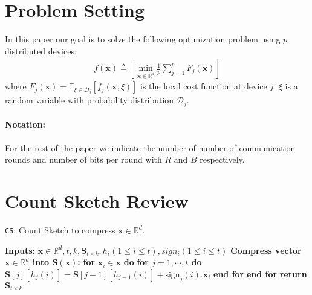 
\section{Problem Setting}
In this paper our goal is to solve the following optimization problem using $p$ distributed devices:
\begin{align}
    f(\boldsymbol{x})\triangleq \left[\min_{\boldsymbol{x}\in \mathbb{R}^{d}}\frac{1}{p}\sum_{j=1}^{p}F_j(\boldsymbol{x})\right]
\end{align}
where $F_j(\boldsymbol{x})=\mathbb{E}_{\xi\in\mathcal{D}_j}\left[f_j\left(\boldsymbol{x},\xi\right)\right]$ is the local cost function at device $j$. $\xi$ is a random variable with probability distribution $\mathcal{D}_j$.


\paragraph{Notation:} For the rest of the paper we indicate the number of number of communication rounds and number of bits per round with $R$ and $B$ respectively.

\section{Count Sketch Review}

\begin{algorithm}[H]
\caption{\texttt{CS}: Count Sketch to compress ${\boldsymbol{x}}\in\mathbb{R}^{d}$. }\label{Alg:csketch}
\begin{algorithmic}[1]
\State \textbf{Inputs:} $\boldsymbol{x}\in\mathbb{R}^{d}, t, k, \mathbf{S}_{t\times k}, h_i (1\leq i\leq t), sign_i (1\leq i\leq t)$
\State \textbf{Compress vector $\boldsymbol{x}\in\mathbb{R}^{d}$ into $\mathbf{S}\left(\boldsymbol{x}\right)$:}
\State \textbf{for} $\boldsymbol{x}_i\in\boldsymbol{x}$ \textbf{do}
\State \quad\textbf{for $j=1,\cdots,t$ do}
\State \quad\quad $\mathbf{S}[j][h_j(i)]=\mathbf{S}[j-1][h_{j-1}(i)]+\text{sign}_j(i).\boldsymbol{x}_i$ 
\State \quad\textbf{end for}
\State \textbf{end for}
\State \textbf{return} $\mathbf{S}_{t\times k}$
\end{algorithmic}
\end{algorithm}

